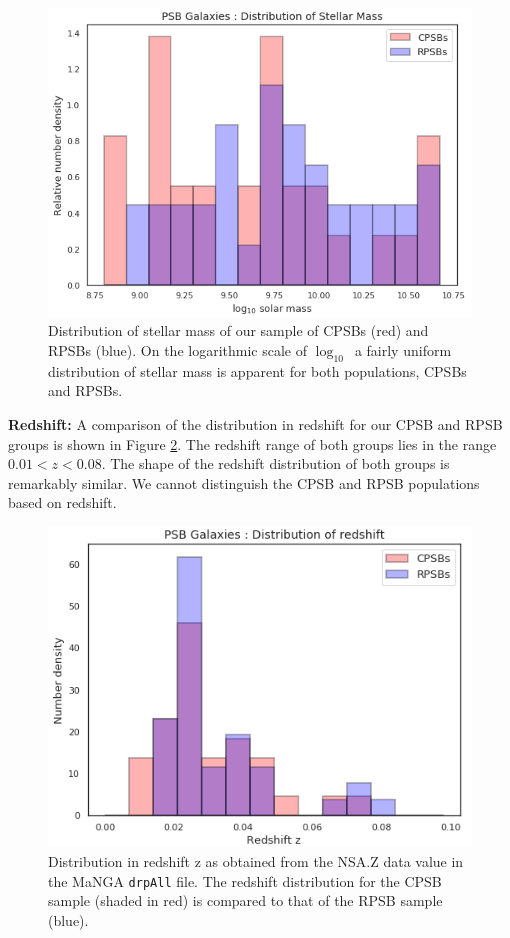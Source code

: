 \begin{figure}
    \centering
    \includegraphics[width=\columnwidth]{images/JupyterPlots/Dist-Stellar-Mass-All.png}
    \caption[Distribution of stellar mass for CPSBs and RPSBs]{Distribution of stellar mass of our sample of CPSBs (red) and RPSBs (blue). On the logarithmic scale of $\log_{10}$\Msun\ a fairly uniform distribution of stellar mass is apparent for both populations, CPSBs and RPSBs.}
    \label{fig:stellar-mass-plot}
\end{figure}

\textbf{Redshift:} A comparison of the distribution in redshift for our CPSB and RPSB groups is shown in Figure \ref{fig:redshift-plot}. The redshift range of both groups lies in the range $0.01 < z < 0.08$. The shape of the redshift distribution of both groups is remarkably similar. We cannot distinguish the CPSB and RPSB populations based on redshift.

\begin{figure}
    \centering
    \includegraphics[width=\columnwidth]{images/JupyterPlots/Dist-z-All.png}
    \caption[PSB distribution in redshift]{Distribution in redshift z as obtained from the NSA.Z data value in the MaNGA \texttt{drpAll} file. The redshift distribution for the CPSB sample (shaded in red) is compared to that of the RPSB sample (blue).}
    \label{fig:redshift-plot}
\end{figure}

